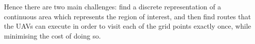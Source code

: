 Hence there are two main challenges: find a discrete representation of a continuous area which represents the region of interest, and then find routes that the UAVs can execute in order to visit each of the grid points exactly once, while minimising the cost of doing so.









